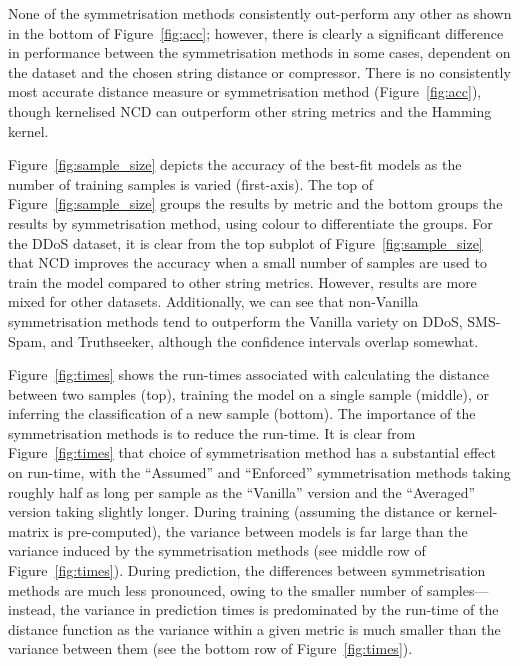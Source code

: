 \documentclass[preprint,12pt]{article}
\begin{document}
None of the symmetrisation methods consistently out-perform any other as shown in the bottom of Figure~\ref{fig:acc}; however, there is clearly a significant difference in performance between the symmetrisation methods in some cases, dependent on the dataset and the chosen string distance or compressor. 
There is no consistently most accurate distance measure or symmetrisation method (Figure~\ref{fig:acc}), though kernelised NCD can outperform other string metrics and the Hamming kernel.

Figure~\ref{fig:sample_size} depicts the accuracy of the best-fit models as the number of training samples is varied (first-axis). 
The top of Figure~\ref{fig:sample_size} groups the results by metric and the bottom groups the results by symmetrisation method, using colour to differentiate the groups. 
For the DDoS dataset, it is clear from the top subplot of Figure~\ref{fig:sample_size} that NCD improves the accuracy when a small number of samples are used to train the model compared to other string metrics. 
However, results are more mixed for other datasets. 
Additionally, we can see that non-Vanilla symmetrisation methods tend to outperform the Vanilla variety on DDoS, SMS-Spam, and Truthseeker, although the confidence intervals overlap somewhat.

Figure~\ref{fig:times} shows the run-times associated with calculating the distance between two samples (top), training the model on a single sample (middle), or inferring the classification of a new sample (bottom). 
The importance of the symmetrisation methods is to reduce the run-time. 
It is clear from Figure~\ref{fig:times} that choice of symmetrisation method has a substantial effect on run-time, with the ``Assumed'' and ``Enforced'' symmetrisation methods taking roughly half as long per sample as the ``Vanilla'' version and the ``Averaged'' version taking slightly longer. 
During training (assuming the distance or kernel-matrix is pre-computed), the variance between models is far large than the variance induced by the symmetrisation methods (see middle row of Figure~\ref{fig:times}). 
During prediction, the differences between symmetrisation methods are much less pronounced, owing to the smaller number of samples---instead, the variance in prediction times is predominated by the run-time of the distance function as the variance within a given metric is much smaller than the variance between them (see the bottom row of Figure~\ref{fig:times}).
\end{document}
